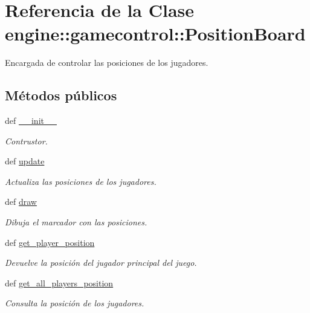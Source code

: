 \hypertarget{classengine_1_1gamecontrol_1_1PositionBoard}{
\section{\-Referencia de la \-Clase engine\-:\-:gamecontrol\-:\-:\-Position\-Board}
\label{classengine_1_1gamecontrol_1_1PositionBoard}
}


\-Encargada de controlar las posiciones de los jugadores.  


\subsection*{\-Métodos públicos}
\begin{DoxyCompactItemize}
\item 
def \hyperlink{classengine_1_1gamecontrol_1_1PositionBoard_acd968378f807071b9163ce538307e0e6}{\-\_\-\-\_\-init\-\_\-\-\_\-}
\begin{DoxyCompactList}\small\item\em \-Contrustor. \end{DoxyCompactList}\item 
def \hyperlink{classengine_1_1gamecontrol_1_1PositionBoard_a45c59f12ce4f37ecead026082db33017}{update}
\begin{DoxyCompactList}\small\item\em \-Actualiza las posiciones de los jugadores. \end{DoxyCompactList}\item 
def \hyperlink{classengine_1_1gamecontrol_1_1PositionBoard_a84ddefb01d0c41e38cf0f9e3408ec99b}{draw}
\begin{DoxyCompactList}\small\item\em \-Dibuja el marcador con las posiciones. \end{DoxyCompactList}\item 
def \hyperlink{classengine_1_1gamecontrol_1_1PositionBoard_a26ab6982b91c643f159e2f18bdf93b34}{get\-\_\-player\-\_\-position}
\begin{DoxyCompactList}\small\item\em \-Devuelve la posición del jugador principal del juego. \end{DoxyCompactList}\item 
def \hyperlink{classengine_1_1gamecontrol_1_1PositionBoard_af1b5bb4a01c0e538d4fda3a4cdab1010}{get\-\_\-all\-\_\-players\-\_\-position}
\begin{DoxyCompactList}\small\item\em \-Consulta la posición de los jugadores. \end{DoxyCompactList}\end{DoxyCompactItemize}
